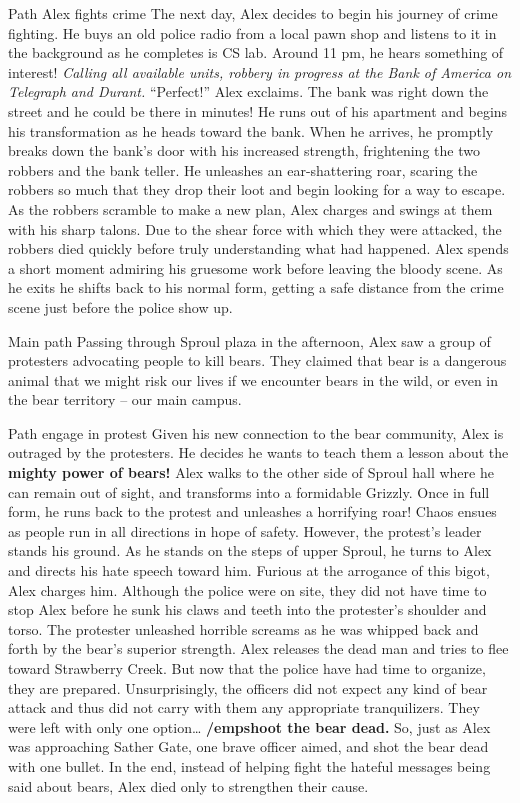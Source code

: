 \documentclass{article}
\begin{document}
Path Alex fights crime
The next day, Alex decides to begin his journey of crime fighting. He buys an old police radio from a local pawn shop and listens to it in the background as he completes is CS lab. Around 11 pm, he hears something of interest! \textit{Calling all available units, robbery in progress at the Bank of America on Telegraph and Durant.} “Perfect!” Alex exclaims. The bank was right down the street and he could be there in minutes! He runs out of his apartment and begins his transformation as he heads toward the bank. When he arrives, he promptly breaks down the bank’s door with his increased strength, frightening the two robbers and the bank teller. He unleashes an ear-shattering roar, scaring the robbers so much that they drop their loot and begin looking for a way to escape. As the robbers scramble to make a new plan, Alex charges and swings at them with his sharp talons. Due to the shear force with which they were attacked, the robbers died quickly before truly understanding what had happened. Alex spends a short moment admiring his gruesome work before leaving the bloody scene. As he exits he shifts back to his normal form, getting a safe distance from the crime scene just before the police show up. 





Main path
Passing through Sproul plaza in the afternoon, Alex saw a group of protesters advocating people to kill bears. They claimed that bear is a dangerous animal that we might risk our lives if we encounter bears in the wild, or even in the bear territory -- our main campus.
  





Path engage in protest
Given his new connection to the bear community, Alex is outraged by the protesters. He decides he wants to teach them a lesson about the \textbf{mighty power of bears!} Alex walks to the other side of Sproul hall where he can remain out of sight, and transforms into a formidable Grizzly. Once in full form, he runs back to the protest and unleashes a horrifying roar! Chaos ensues as people run in all directions in hope of safety. However, the protest’s leader stands his ground. As he stands on the steps of upper Sproul, he turns to Alex and directs his hate speech toward him. Furious at the arrogance of this bigot, Alex charges him. Although the police were on site, they did not have time to stop Alex before he sunk his claws and teeth into the protester’s shoulder and torso. The protester unleashed horrible screams as he was whipped back and forth by the bear’s superior strength. Alex releases the dead man and tries to flee toward Strawberry Creek. But now that the police have had time to organize, they are prepared. Unsurprisingly, the officers did not expect any kind of bear attack and thus did not carry with them any appropriate tranquilizers. They were left with only one option… \textbf{/emp{shoot the bear dead.}} So, just as Alex was approaching Sather Gate, one brave officer aimed, and shot the bear dead with one bullet. In the end, instead of helping fight the hateful messages being said about bears, Alex died only to strengthen their cause. 
\end{document}
